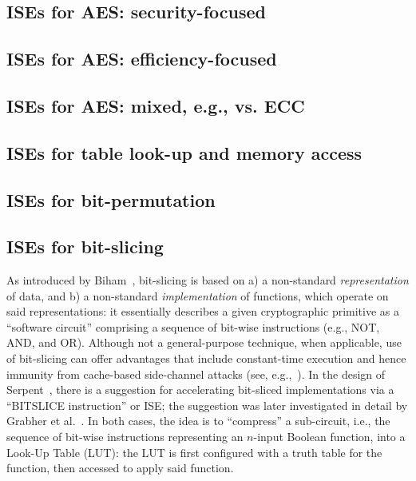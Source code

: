 \subsection*{ISEs for AES: security-focused}
\cite{SCARV:TilGro:07:a}
\subsection*{ISEs for AES: efficiency-focused}
\cite{SCARV:TilGroSze:05,SCARV:TilGro:06,SCARV:APRJ:11}
\subsection*{ISEs for AES: mixed, e.g., vs. ECC}
\cite{SCARV:TilGro:05,SCARV:TilGro:07:b}

\subsection*{ISEs for table look-up and memory access}
\cite{SCARV:FisLee:01,SCARV:FisLee:05:a,SCARV:FisLee:05:b,SCARV:HilYinLee:08}
\subsection*{ISEs for bit-permutation}
\cite{SCARV:ShiLee:00,SCARV:YanLee:00,SCARV:McGLee:01,SCARV:LeeShiYan:01,SCARV:ShiLee:02,SCARV:ShiYanLee:03,SCARV:LSYRR:04,MASCAB:LeeYanShi:05,SCARV:HilYinLee:08,SCARV:HilLee:08,SCARV:ShiYanLee:08}
\subsection*{ISEs for bit-slicing}
As introduced by Biham~\cite{SCARV:Biham:97}, bit-slicing is based on
a) a non-standard {\em representation} of data,
   and
b) a non-standard {\em implementation} of functions, which operate on
   said representations:
it essentially describes a given cryptographic primitive as a  ``software 
circuit'' comprising a sequence of bit-wise instructions (e.g., NOT, AND, 
and OR).  Although not a general-purpose technique, when applicable, use
of bit-slicing can offer advantages that include constant-time execution 
and hence immunity from cache-based side-channel attacks
(see, e.g.,~\cite{SCARV:KasSch:09}).
In the design of Serpent~\cite[Page 232]{SCARV:BihAndKnu:98}, there is a
suggestion for accelerating bit-sliced implementations via a ``BITSLICE 
instruction'' or ISE; the suggestion was later investigated in detail by 
Grabher et al.~\cite{SCARV:GraGroPag:08}.  In both cases, the idea is to 
``compress'' a sub-circuit, i.e., the sequence of bit-wise instructions 
representing an $n$-input Boolean function, into a Look-Up Table (LUT): 
the LUT is first configured with a truth table for the function, then 
accessed to apply said function.  

